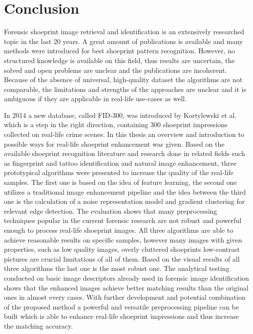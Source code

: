 \documentclass[draft,final]{vutinfth} %
\begin{document}
\chapter{Conclusion}
\par
Forensic shoeprint image retrieval and identification is an extensively researched topic in the last 20 years.
A great amount of publications is available and many methods were introduced for best shoeprint pattern recognition.
However, no structured knowledge is available on this field, thus results are uncertain, the solved and open problems are unclear and the publications are incoherent.
Because of the absence of universal, high-quality dataset the algorithms are not comparable, the limitations and strengths of the approaches are unclear and it is ambiguous if they are applicable in real-life use-cases as well.
\par
In 2014 a new database, called FID-300, was introduced by Kortylewski et al. \cite{kortylewski2014unsupervised} which is a step in the right direction, containing 300 shoeprint impressions collected on real-life crime scenes.
In this thesis an overview and introduction to possible ways for real-life shoeprint enhancement was given.
Based on the available shoeprint recognition literature and research done in related fields such as fingerprint and tattoo identification and natural image enhancement, three prototypical algorithms were presented to increase the quality of the real-life samples.
The first one is based on the idea of feature learning, the second one utilizes a traditional image enhancement pipeline and the idea between the third one is the calculation of a noise representation model and gradient clustering for relevant edge detection.
The evaluation shows that many preprocessing techniques popular in the current forensic research are not robust and powerful enough to process real-life shoeprint images.
All three algorithms are able to achieve reasonable results on specific samples, however many images with given properties, such as low quality images, overly cluttered shoeprints low-contrast pictures are crucial limitations of all of them.
Based on the visual results of all three algorithms the last one is the most robust one.
The analytical testing conducted on basic image descriptors already used in forensic image identification shows that the enhanced images achieve better matching results than the original ones in almost every cases.
With further development and potential combination of the proposed method a powerful and versatile preprocessing pipeline can be built which is able to enhance real-life shoeprint impressions and thus increase the matching accuracy.
\end{document}
